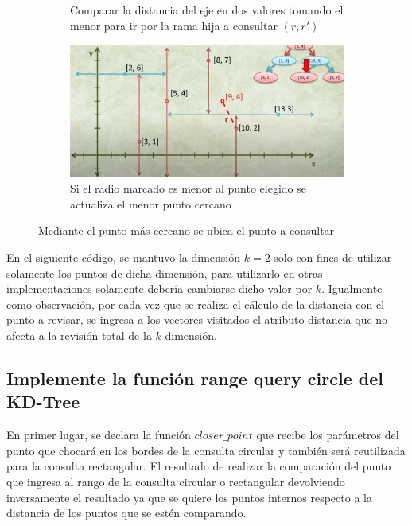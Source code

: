 \documentclass{article}
\begin{document}
\begin{figure}
\begin{subfigure}[b]{0.4\linewidth}
                 \caption{Comparar la distancia del eje en dos valores tomando el menor para ir por la rama hija a consultar $(r, r')$}
                 \label{fig:knn7}
             \end{subfigure}
             \hfill
             \begin{subfigure}[b]{0.4\linewidth}
                 \centering
                 \includegraphics[width=\textwidth]{img/knn8.PNG}
                 \caption{Si el radio marcado es menor al punto elegido se actualiza el menor punto cercano}
                 \label{fig:knn8}
             \end{subfigure}
                \caption{Mediante el punto más cercano se ubica el punto a consultar}
                \label{fig:knn_2_parte}
        \end{figure}
    		
    		En el siguiente código, se mantuvo la dimensión $k=2$ solo con fines de utilizar solamente los puntos de dicha dimensión, para utilizarlo en otras implementaciones solamente debería cambiarse dicho valor por $k$. Igualmente como observación, por cada vez que se realiza el cálculo de la distancia con el punto a revisar, se ingresa a los vectores visitados el atributo distancia que no afecta a la revisión total de la $k$ dimensión.
    		
    		
    		
		
		\subsection{Implemente la función range query circle del KD-Tree}
		    
		    En primer lugar, se declara la función $closer\_point$ que recibe los parámetros del punto que chocará en los bordes de la consulta circular y también será reutilizada para la consulta rectangular. El resultado de realizar la comparación del punto que ingresa al rango de la consulta circular o rectangular devolviendo inversamente el resultado ya que se quiere los puntos internos respecto a la distancia de los puntos que se estén comparando.
		
\end{document}
